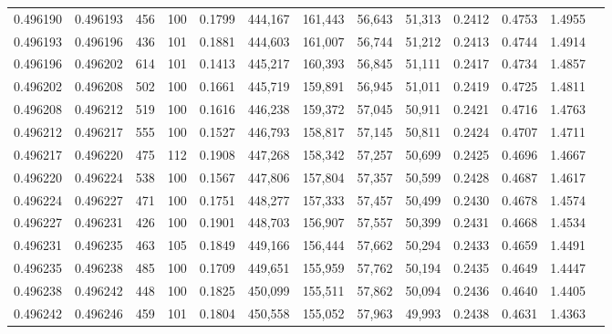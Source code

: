 \begin{tabular}{rrrrrrrrrrrrr}
0.496190 & 0.496193 &   456 & 100 &                                     0.1799 & 444,167 & 161,443 &  56,643 &  51,313 & 0.2412 & 0.4753 & 1.4955 \\
0.496193 & 0.496196 &   436 & 101 &                                     0.1881 & 444,603 & 161,007 &  56,744 &  51,212 & 0.2413 & 0.4744 & 1.4914 \\
0.496196 & 0.496202 &   614 & 101 &                                     0.1413 & 445,217 & 160,393 &  56,845 &  51,111 & 0.2417 & 0.4734 & 1.4857 \\
0.496202 & 0.496208 &   502 & 100 &                                     0.1661 & 445,719 & 159,891 &  56,945 &  51,011 & 0.2419 & 0.4725 & 1.4811 \\
0.496208 & 0.496212 &   519 & 100 &                                     0.1616 & 446,238 & 159,372 &  57,045 &  50,911 & 0.2421 & 0.4716 & 1.4763 \\
0.496212 & 0.496217 &   555 & 100 &                                     0.1527 & 446,793 & 158,817 &  57,145 &  50,811 & 0.2424 & 0.4707 & 1.4711 \\
0.496217 & 0.496220 &   475 & 112 &                                     0.1908 & 447,268 & 158,342 &  57,257 &  50,699 & 0.2425 & 0.4696 & 1.4667 \\
0.496220 & 0.496224 &   538 & 100 &                                     0.1567 & 447,806 & 157,804 &  57,357 &  50,599 & 0.2428 & 0.4687 & 1.4617 \\
0.496224 & 0.496227 &   471 & 100 &                                     0.1751 & 448,277 & 157,333 &  57,457 &  50,499 & 0.2430 & 0.4678 & 1.4574 \\
0.496227 & 0.496231 &   426 & 100 &                                     0.1901 & 448,703 & 156,907 &  57,557 &  50,399 & 0.2431 & 0.4668 & 1.4534 \\
0.496231 & 0.496235 &   463 & 105 &                                     0.1849 & 449,166 & 156,444 &  57,662 &  50,294 & 0.2433 & 0.4659 & 1.4491 \\
0.496235 & 0.496238 &   485 & 100 &                                     0.1709 & 449,651 & 155,959 &  57,762 &  50,194 & 0.2435 & 0.4649 & 1.4447 \\
0.496238 & 0.496242 &   448 & 100 &                                     0.1825 & 450,099 & 155,511 &  57,862 &  50,094 & 0.2436 & 0.4640 & 1.4405 \\
0.496242 & 0.496246 &   459 & 101 &                                     0.1804 & 450,558 & 155,052 &  57,963 &  49,993 & 0.2438 & 0.4631 & 1.4363 \\

\end{tabular}
